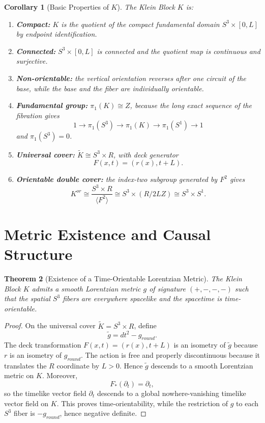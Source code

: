 \documentclass[11pt]{article}
\theoremstyle{canonmath}
\newtheorem{theorem}{Theorem}[section]
\newtheorem{corollary}[theorem]{Corollary}
\theoremstyle{canonpostulate}
\theoremstyle{canonproposition}
\providecommand{\Klein}{\mathcal{K}}
\providecommand{\R}{\mathbb{R}}
\providecommand{\Z}{\mathbb{Z}}
\providecommand{\Sone}{S^1}
\providecommand{\Sthree}{S^3}
\def\mathrm#1{#1}%
\def\mathbb#1{#1}%
\def\mathcal#1{#1}%
\begin{document}
\begin{corollary}[Basic Properties of $\Klein$] \label{cor:basic}
The Klein Block $\Klein$ is:
\begin{enumerate}
    \item \textbf{Compact:} $\Klein$ is the quotient of the compact fundamental domain $\Sthree\times[0,L]$ by endpoint identification.
    \item \textbf{Connected:} $\Sthree\times[0,L]$ is connected and the quotient map is continuous and surjective.
    \item \textbf{Non-orientable:} the vertical orientation reverses after one circuit of the base, while the base and the fiber are individually orientable.
    \item \textbf{Fundamental group:} $\pi_1(\Klein)\cong\mathbb Z$, because the long exact sequence of the fibration gives
    \[
    1\to\pi_1(\Sthree)\to\pi_1(\Klein)\to\pi_1(\Sone)\to1
    \]
    and $\pi_1(\Sthree)=0$.
    \item \textbf{Universal cover:} $\widetilde{\Klein}\cong\Sthree\times\R$, with deck generator
    \[
    F(x,t)=(r(x),t+L).
    \]
    \item \textbf{Orientable double cover:} the index-two subgroup generated by $F^2$ gives
    \[
    \Klein^{\mathrm{or}}\cong \frac{\Sthree\times\R}{\langle F^2\rangle}
    \cong \Sthree\times(\R/2L\Z)\cong\Sthree\times\Sone.
    \]
\end{enumerate}
\end{corollary}

\section{Metric Existence and Causal Structure}

\begin{theorem}[Existence of a Time-Orientable Lorentzian Metric] \label{thm:metric}
The Klein Block $\Klein$ admits a smooth Lorentzian metric $g$ of signature $(+,-,-,-)$ such that the spatial $\Sthree$ fibers are everywhere spacelike and the spacetime is time-orientable.
\end{theorem}
\begin{proof}
On the universal cover $\widetilde{\Klein}=\Sthree\times\R$, define
\begin{equation}
    \tilde g=dt^2-g_{\mathrm{round}}.
\end{equation}
The deck transformation $F(x,t)=(r(x),t+L)$ is an isometry of $\tilde g$ because $r$ is an isometry of $g_{\mathrm{round}}$. The action is free and properly discontinuous because it translates the $\R$ coordinate by $L>0$. Hence $\tilde g$ descends to a smooth Lorentzian metric on $\Klein$. Moreover,
\[
F_*(\partial_t)=\partial_t,
\]
so the timelike vector field $\partial_t$ descends to a global nowhere-vanishing timelike vector field on $\Klein$. This proves time-orientability, while the restriction of $g$ to each $\Sthree$ fiber is $-g_{\mathrm{round}}$, hence negative definite.
\end{proof}
\end{document}
